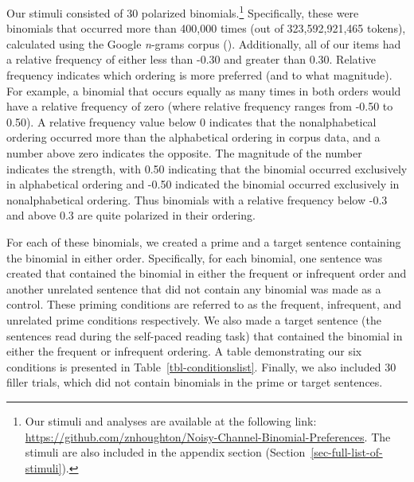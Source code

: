 \documentclass[
  12pt,
]{scrartcl}
\begin{document}
Our stimuli consisted of 30 polarized binomials.\footnote{Our stimuli
  and analyses are available at the following link:
  \url{https://github.com/znhoughton/Noisy-Channel-Binomial-Preferences}.
  The stimuli are also included in the appendix section
  (Section~\ref{sec-full-list-of-stimuli}).} Specifically, these were
binomials that occurred more than 400,000 times (out of 323,592,921,465
tokens), calculated using the Google \emph{n}-grams corpus
(). Additionally, all of our items had a relative frequency of
either less than -0.30 and greater than 0.30. Relative frequency
indicates which ordering is more preferred (and to what magnitude). For
example, a binomial that occurs equally as many times in both orders
would have a relative frequency of zero (where relative frequency ranges
from -0.50 to 0.50). A relative frequency value below 0 indicates that
the nonalphabetical ordering occurred more than the alphabetical
ordering in corpus data, and a number above zero indicates the opposite.
The magnitude of the number indicates the strength, with 0.50 indicating
that the binomial occurred exclusively in alphabetical ordering and
-0.50 indicated the binomial occurred exclusively in nonalphabetical
ordering. Thus binomials with a relative frequency below -0.3 and above
0.3 are quite polarized in their ordering.

For each of these binomials, we created a prime and a target sentence
containing the binomial in either order. Specifically, for each
binomial, one sentence was created that contained the binomial in either
the frequent or infrequent order and another unrelated sentence that did
not contain any binomial was made as a control. These priming conditions
are referred to as the frequent, infrequent, and unrelated prime
conditions respectively. We also made a target sentence (the sentences
read during the self-paced reading task) that contained the binomial in
either the frequent or infrequent ordering. A table demonstrating our
six conditions is presented in Table~\ref{tbl-conditionslist}. Finally,
we also included 30 filler trials, which did not contain binomials in
the prime or target sentences.
\end{document}
